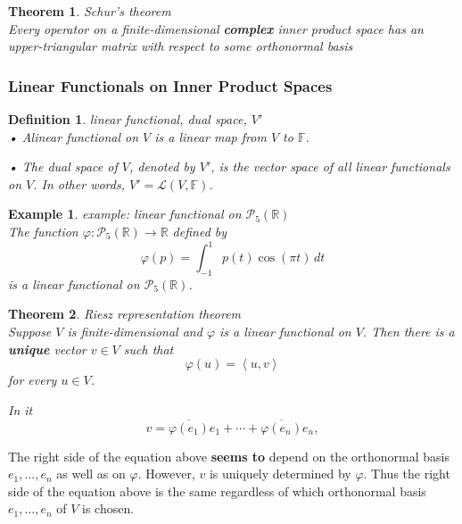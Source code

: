 \documentclass{article}
\newtheorem{theorem}{Theorem}[subsection]
\newtheorem{example}{Example}[subsection]
\newtheorem{definition}{Definition}[subsection]
\newcommand{\RR}{\mathbb{R}}
\newcommand{\FF}{\mathbb{F}}
\begin{document}
\begin{CJK}{UTF8}{gkai}
\begin{theorem}
    Schur's theorem\\

    Every operator on a finite-dimensional \textbf{complex} inner product space has an upper-triangular matrix with respect to some orthonormal basis
\end{theorem}


\subsubsection{Linear Functionals on Inner Product Spaces}

\begin{definition}
    linear functional, dual space, $V'$\\

    • Alinear functional on $V$ is a linear map from $V$ to $\FF$.

    • The dual space of $V$, denoted by $V'$, is the vector space of all linear functionals on $V$. In other words, $V' = \mathcal{L}(V,\FF)$.
\end{definition}

\begin{example}
    example: linear functional on $\mathcal{P}_5(\RR)$\\

    The function $\varphi: \mathcal{P}_5(\RR) \rightarrow \RR$ defined by
    \[\varphi(p) = \int_{-1}^{1}p(t) \cos(\pi t) \, dt\]
    is a linear functional on $\mathcal{P}_5(\RR)$.
\end{example}

\begin{theorem}
    Riesz representation theorem\\

    Suppose $V$ is finite-dimensional and $\varphi$ is a linear functional on $V$. Then there is a \textbf{unique} vector $v \in V$ such that
    \[\varphi(u) = \left<u,v\right>\]
    for every $u \in V$.

    In it 
    \[ v =\overline{\varphi(e_1)}e_1 +\cdots+\overline{\varphi(e_n)}e_n,\]
\end{theorem}

    The right side of the equation above \textbf{seems to} depend on the orthonormal basis $e_1, \ldots,e_n$ as well as on $\varphi$. However, $v$ is uniquely determined by $\varphi$. Thus the right side of the equation above is the same regardless of which orthonormal basis $e_1,\ldots,e_n$ of $V$ is chosen.


\end{CJK}
\end{document}
